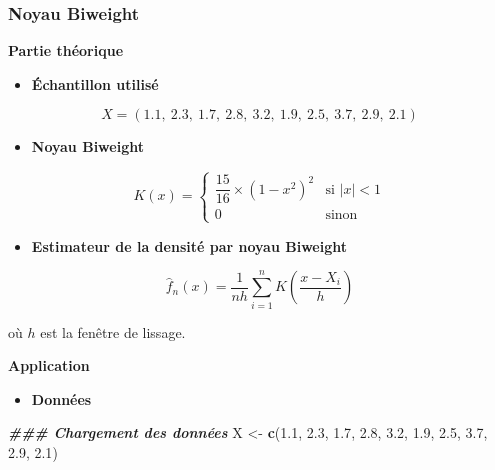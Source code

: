 \documentclass[
  12pt,
]{article}
\newenvironment{Shaded}{\begin{snugshade}}{\end{snugshade}}
\newcommand{\DocumentationTok}[1]{\textcolor[rgb]{0.56,0.35,0.01}{\textbf{\textit{#1}}}}
\newcommand{\FloatTok}[1]{\textcolor[rgb]{0.00,0.00,0.81}{#1}}
\newcommand{\FunctionTok}[1]{\textcolor[rgb]{0.13,0.29,0.53}{\textbf{#1}}}
\newcommand{\NormalTok}[1]{#1}
\newcommand{\OtherTok}[1]{\textcolor[rgb]{0.56,0.35,0.01}{#1}}
\providecommand{\tightlist}{%
  \setlength{\itemsep}{0pt}\setlength{\parskip}{0pt}}
\begin{document}
\subsubsection{Noyau Biweight}\label{noyau-biweight}

\textbf{Partie théorique}

\begin{itemize}
\tightlist
\item
  \textbf{Échantillon utilisé}
\end{itemize}

\[
X = (1.1,\ 2.3,\ 1.7,\ 2.8,\ 3.2,\ 1.9,\ 2.5,\ 3.7,\ 2.9,\ 2.1)
\]

\begin{itemize}
\tightlist
\item
  \textbf{Noyau Biweight}
\end{itemize}

\[
K(x) =
\begin{cases}
\dfrac{15}{16} \times (1 - x^2)^2 & \text{si } |x| < 1 \\
0 & \text{sinon}
\end{cases}
\]

\begin{itemize}
\tightlist
\item
  \textbf{Estimateur de la densité par noyau Biweight}
\end{itemize}

\[
\hat{f}_n(x) = \dfrac{1}{n h} \sum_{i=1}^{n} K\left( \dfrac{x - X_i}{h} \right)
\]

où \(h\) est la fenêtre de lissage.

\textbf{Application}

\begin{itemize}
\tightlist
\item
  \textbf{Données}
\end{itemize}

\begin{Shaded}
\begin{Highlighting}[]
\DocumentationTok{\#\#\# Chargement des données}
\NormalTok{X }\OtherTok{\textless{}{-}} \FunctionTok{c}\NormalTok{(}\FloatTok{1.1}\NormalTok{, }\FloatTok{2.3}\NormalTok{, }\FloatTok{1.7}\NormalTok{, }\FloatTok{2.8}\NormalTok{, }\FloatTok{3.2}\NormalTok{, }\FloatTok{1.9}\NormalTok{, }\FloatTok{2.5}\NormalTok{, }\FloatTok{3.7}\NormalTok{, }\FloatTok{2.9}\NormalTok{, }\FloatTok{2.1}\NormalTok{)}
\end{Highlighting}
\end{Shaded}
\end{document}
